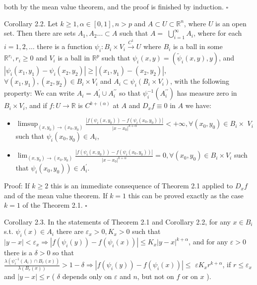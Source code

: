 \documentclass[10pt]{article}
\begin{document}
both by the mean value theorem, and the proof is finished by induction. \(\square\)

Corollary 2.2. Let $k \geq 1, \alpha \in[0,1], n>p$ and $A \subset U \subset \mathbb{R}^{n}$, where $U$ is an open set. Then there are sets $A_{1}, A_{2} \ldots \subset A$ such that $A=$ $\bigcup_{i=1}^{\infty} A_{i}$, where for each $i=1,2, \ldots$ there is a function $\psi_{i}: B_{i} \times V_{i} \xrightarrow{C^{1}} U$ where $B_{i}$ is a ball in some $\mathbb{R}^{r_{i}}, r_{i} \geq 0$ and $V_{i}$ is a ball in $\mathbb{R}^{p}$ such that $\psi_{i}(x, y)=\left(\widetilde{\psi}_{i}(x, y), y\right)$, and $\left|\psi_{i}\left(x_{1}, y_{1}\right)-\psi_{i}\left(x_{2}, y_{2}\right)\right| \geq\left|\left(x_{1}, y_{1}\right)-\left(x_{2}, y_{2}\right)\right|$, $\forall\left(x_{1}, y_{1}\right),\left(x_{2}, y_{2}\right) \in B_{i} \times V_{i}$ and $A_{i} \subset \psi_{i}\left(B_{i} \times V_{i}\right)$, with the following property: We can write $A_{i}=A_{i}^{\prime} \cup A_{i}^{\prime \prime}$ so that $\psi_{i}^{-1}\left(A_{i}^{\prime \prime}\right)$ has measure zero in $B_{i} \times V_{i}$, and if $f: U \rightarrow \mathbb{R}$ is $C^{k+(\alpha)}$ at $A$ and $D_{x} f \equiv 0$ in $A$ we have:

\begin{itemize}
  \item[-] $\limsup _{\left(x, y_{0}\right) \rightarrow\left(x_{0}, y_{0}\right)} \frac{\left|f\left(\psi_{i}\left(x, y_{0}\right)\right)-f\left(\psi_{i}\left(x_{0}, y_{0}\right)\right)\right|}{\left|x-x_{0}\right|^{k+\alpha}}<+\infty, \forall\left(x_{0}, y_{0}\right) \in B_{i} \times$ $V_{i}$ such that $\psi_{i}\left(x_{0}, y_{0}\right) \in A_{i}$,
  \item[-] $\lim _{\left(x, y_{0}\right) \rightarrow\left(x_{0}, y_{0}\right)} \frac{\left|f\left(\psi_{i}\left(x, y_{0}\right)\right)-f\left(\psi_{i}\left(x_{0}, y_{0}\right)\right)\right|}{\left|x-x_{0}\right|^{k+\alpha}}=0, \forall\left(x_{0}, y_{0}\right) \in B_{i} \times V_{i}$ such that $\left.\psi_{i}\left(x_{0}, y_{0}\right)\right) \in A_{i}^{\prime}$.
\end{itemize}

Proof: If $k \geq 2$ this is an immediate consequence of Theorem 2.1 applied to $D_{x} f$ and of the mean value theorem. If $k=1$ this can be proved exactly as the case $k=1$ of the Theorem 2.1. \(\square\)

Corollary 2.3. In the statements of Theorem 2.1 and Corollary 2.2, for any $x \in B_{i}$ s.t. $\psi_{i}(x) \in A_{i}$ there are $\varepsilon_{x}>0, K_{x}>0$ such that $|y-x|<\varepsilon_{x} \Rightarrow\left|f\left(\psi_{i}(y)\right)-f\left(\psi_{i}(x)\right)\right| \leq K_{x}|y-x|^{k+\alpha}$, and for any $\varepsilon>0$ there is a $\delta>0$ so that $\frac{\lambda\left(\psi_{i}^{-1}\left(A_{i}\right) \cap B_{r}(x)\right)}{\lambda\left(B_{r}(x)\right)}>1-\delta \Rightarrow\left|f\left(\psi_{i}(y)\right)-f\left(\psi_{i}(x)\right)\right| \leq$ $\varepsilon K_{x} r^{k+\alpha}$, if $r \leq \varepsilon_{x}$ and $|y-x| \leq r$ ( $\delta$ depends only on $\varepsilon$ and $n$, but not on $f$ or on $x$ ).
\end{document}
